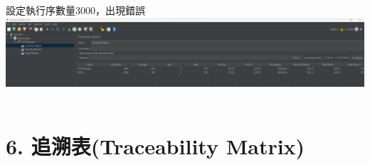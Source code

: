 \documentclass{report}
\begin{document}
\\
\newline
\\
設定執行序數量3000，出現錯誤 \\
\includegraphics[scale=0.35]{3000.png}
\\
\newline
\\
\section*{6. 追溯表(Traceability Matrix)}
\end{document}

